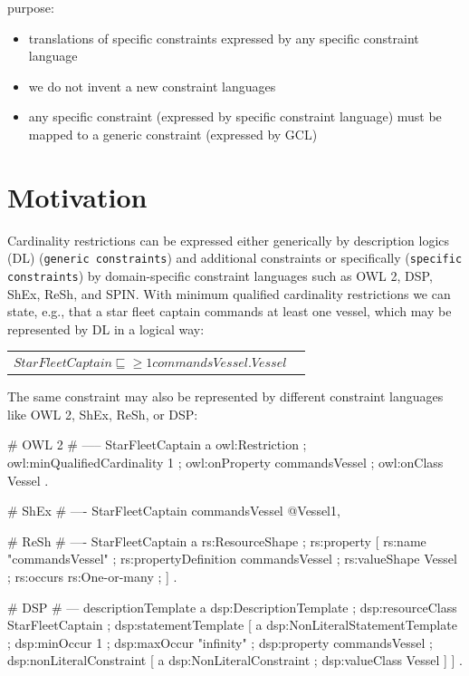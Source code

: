 \documentclass{llncs}
\newcommand{\ms}[1]{\texttt{#1}}
\newenvironment{DL}{
	\begin{center}
  \begin{tabular}{r l}

}{
  \end{tabular}
	\end{center}
}
\begin{document}
purpose:
\begin{itemize}
	\item translations of specific constraints expressed by any specific constraint language
	\item we do not invent a new constraint languages
\end{itemize}



\begin{itemize}
	\item any specific constraint (expressed by specific constraint language) must be mapped to a generic constraint (expressed by GCL)
\end{itemize}

\section{Motivation}

Cardinality restrictions can be expressed either generically by description logics (DL) (\ms{generic constraints}) and additional constraints or specifically (\ms{specific constraints}) by domain-specific constraint languages such as OWL 2, DSP, ShEx, ReSh, and SPIN.
With minimum qualified cardinality restrictions we can state, e.g., that a star fleet captain commands at least one vessel, which may be represented by DL in a logical way:

\begin{DL}
$StarFleetCaptain \sqsubseteq \geq1 commandsVessel . Vessel $
\end{DL}

The same constraint may also be represented by different constraint languages like OWL 2, ShEx, ReSh, or DSP:

\begin{ex}
# OWL 2
# -----
StarFleetCaptain
    a owl:Restriction ;
    owl:minQualifiedCardinality 1 ;
    owl:onProperty commandsVessel ;
    owl:onClass Vessel .
		
# ShEx
# ----
StarFleetCaptain { commandsVessel @Vessel{1, } }

# ReSh
# ----
StarFleetCaptain a rs:ResourceShape ; rs:property [
    rs:name "commandsVessel" ; rs:propertyDefinition commandsVessel ;
    rs:valueShape Vessel ;
    rs:occurs rs:One-or-many ; ] .
				
# DSP
# ---			
descriptionTemplate a dsp:DescriptionTemplate ; 
    dsp:resourceClass StarFleetCaptain ; 
    dsp:statementTemplate [ a dsp:NonLiteralStatementTemplate ;
        dsp:minOccur 1 ; dsp:maxOccur "infinity" ; 
        dsp:property commandsVessel ; 
        dsp:nonLiteralConstraint [ a dsp:NonLiteralConstraint ;
            dsp:valueClass Vessel ] ] .
\end{ex}
\end{document}
